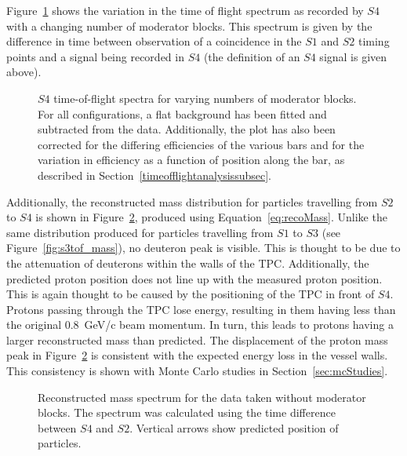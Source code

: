 Figure~\ref{fig:s4tof} shows the variation in the time of flight spectrum as recorded by $\mathit{S4}$ with a changing number of moderator blocks.
This spectrum is given by the difference in time between observation of a coincidence in the $\mathit{S1}$ and $\mathit{S2}$ timing points and a signal being recorded in $\mathit{S4}$ (the definition of an $\mathit{S4}$ signal is given above).

\begin{figure}[ht]
  \begin{adjustbox}{max totalsize={\textwidth}{.5\textheight},center}
    
  \end{adjustbox}
  \caption{$\mathit{S4}$ time-of-flight spectra for varying numbers of moderator blocks. For all configurations, a flat background has been fitted and subtracted from the data. Additionally, the plot has also been corrected for the differing efficiencies of the various bars and for the variation in efficiency as a function of position along the bar, as described in Section~\ref{timeofflightanalysissubsec}.}
  \label{fig:s4tof}	
\end{figure}

Additionally, the reconstructed mass distribution for particles travelling from $\mathit{S2}$ to $\mathit{S4}$ is shown in Figure~\ref{fig:s4tof_mass}, produced using Equation~\ref{eq:recoMass}.
Unlike the same distribution produced for particles travelling from $\mathit{S1}$ to $\mathit{S3}$ (see Figure~\ref{fig:s3tof_mass}), no deuteron peak is visible.
This is thought to be due to the attenuation of deuterons within the walls of the TPC.
Additionally, the predicted proton position does not line up with the measured proton position. 
This is again thought to be caused by the positioning of the TPC in front of $\mathit{S4}$.
Protons passing through the TPC lose energy, resulting in them having less than the original 0.8~GeV/c beam momentum.
In turn, this leads to protons having a larger reconstructed mass than predicted.
The displacement of the proton mass peak in Figure~\ref{fig:s4tof_mass} is consistent with the expected energy loss in the vessel walls.
This consistency is shown with Monte Carlo studies in Section~\ref{sec:mcStudies}.

\begin{figure}[ht]
  \centering
  \begin{adjustbox}{max totalsize={.9\textwidth}{.5\textheight},center}
    
  \end{adjustbox}
  \caption{Reconstructed mass spectrum for the data taken without moderator blocks. The spectrum was calculated using the time difference between $\mathit{S4}$ and $\mathit{S2}$. Vertical arrows show predicted position of particles.}
  \label{fig:s4tof_mass}
\end{figure}


